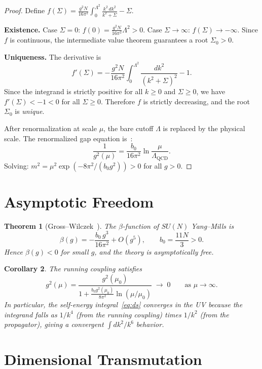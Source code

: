 \documentclass[11pt]{article}
\newtheorem{theorem}{Theorem}
\newtheorem{corollary}[theorem]{Corollary}
\theoremstyle{definition}
\theoremstyle{remark}
\begin{document}
\begin{proof}
Define $f(\Sigma) = \frac{g^2 N}{16\pi^2}\int_0^{\Lambda^2}
\frac{k^2\,dk^2}{k^2 + \Sigma} - \Sigma$.

\textbf{Existence.}
Case $\Sigma = 0$: $f(0) = \frac{g^2 N}{16\pi^2}\Lambda^2 > 0$.
Case $\Sigma \to \infty$: $f(\Sigma) \to -\infty$.
Since $f$ is continuous, the intermediate value theorem guarantees
a root $\Sigma_0 > 0$.

\textbf{Uniqueness.}
The derivative is
\[
  f'(\Sigma) = -\frac{g^2 N}{16\pi^2}\int_0^{\Lambda^2}
  \frac{dk^2}{(k^2 + \Sigma)^2} - 1.
\]
Since the integrand is strictly positive for all $k \ge 0$ and
$\Sigma \ge 0$, we have $f'(\Sigma) < -1 < 0$ for all $\Sigma \ge 0$.
Therefore $f$ is strictly decreasing, and the root $\Sigma_0$ is
\emph{unique}.

After renormalization at scale $\mu$, the bare cutoff $\Lambda$ is
replaced by the physical scale. The renormalized gap equation
is~\cite{gross,wilson}:
\[
  \frac{1}{g^2(\mu)} = \frac{b_0}{16\pi^2}\ln\frac{\mu}{\Lambda_{\mathrm{QCD}}}.
\]
Solving:
$m^2 = \mu^2 \exp(-8\pi^2/(b_0 g^2)) > 0$ for all $g > 0$.
\end{proof}

\section{Asymptotic Freedom}

\begin{theorem}[Gross--Wilczek~\cite{gross}]\label{thm:af}
The $\beta$-function of $SU(N)$ Yang--Mills is
\[
  \beta(g) = -\frac{b_0\,g^3}{16\pi^2} + O(g^5),
  \qquad b_0 = \frac{11N}{3} > 0.
\]
Hence $\beta(g) < 0$ for small $g$, and the theory is
asymptotically free.
\end{theorem}

\begin{corollary}\label{cor:uv}
The running coupling satisfies
\[
  g^2(\mu) = \frac{g^2(\mu_0)}{1 + \frac{b_0 g^2(\mu_0)}{8\pi^2}
  \ln(\mu/\mu_0)} \;\longrightarrow\; 0
  \qquad \text{as } \mu \to \infty.
\]
In particular, the self-energy integral~\eqref{eq:ds} converges in
the UV because the integrand falls as $1/k^4$ (from the running
coupling) times $1/k^2$ (from the propagator), giving a convergent
$\int dk^2/k^6$ behavior.
\end{corollary}

\section{Dimensional Transmutation}
\end{document}
